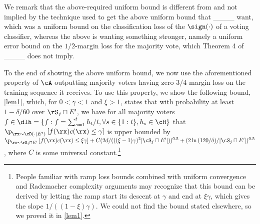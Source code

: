   We remark that the above-required uniform bound is different from and not implied by the technique used to get the above uniform bound that ____ want, which was a uniform bound on the classification loss of the $ \sign(\cdot) $ of a voting classifier, whereas the above is wanting something stronger, namely a uniform error bound on the $ 1/2 $-margin loss for the majority vote, which Theorem 4 of ____ does not imply. 

To the end of showing the above uniform bound, we now use the aforementioned property of $ \cA $ outputting majority voters having zero  $ 3/4$ margin loss on the training sequence it receives. 
To use this property, we show the following bound, \cref{lem1},
which, for $0< \gamma< 1 $ and $ \xi>1 $, states that with probability at least $ 1-\delta/60 $ over $ \rS_{j}\sqcap E' $, we have for all majority voters $ f\in\dlh=\{f:f=\sum_{s=1}^{t} h_{t}/t, \forall s\in\{1:t\}, h_{s}\in \cH\} $ that $ \p_{\rx\sim\cD(\cdot |E')}\left[f(\rx)c(\rx)\leq \gamma\right]$ is upper bounded by $ \p_{\rx\sim \rS_{j}\sqcap E'}\left[f(\rx)c(\rx)\leq \xi\gamma\right] +C(2d/(((\xi-1)\gamma)^{2}|\cS_{j}\sqcap E'|))^{0.5}+(2\ln{\left(120/\delta \right)}/|\cS_{j}\sqcap E'|)^{0.5} $, where $ C $ is some universal constant.\footnote{People familiar with ramp loss bounds combined with uniform convergence and Rademacher complexity arguments may recognize that this bound can be derived by letting the ramp start its descent at $ \gamma $ and end at $ \xi \gamma $, which gives the slope $ 1/((1-\xi)\gamma)$. We could not find the bound stated elsewhere, so we proved it in \cref{lem1}.}  

